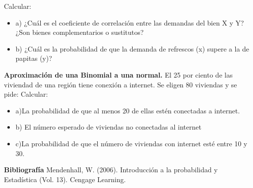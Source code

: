 \documentclass{../oxmathproblems}
\begin{document}
\begin{questions}
Calcular:  
\begin{itemize}
\item  a) ¿Cuál es el coeficiente de correlación entre las demandas del bien X y Y? ¿Son bienes complementarios o sustitutos?
\item  b) ¿Cuál es la probabilidad de que la demanda de refrescos (x) supere a la de papitas (y)?
\end{itemize}

\miquestion \textbf {Aproximación de una Binomial a una normal. } El 25 por ciento de las viviendad de una región tiene conexión a internet. Se eligen 80 viviendas y se pide: 
Calcular:  
\begin{itemize}
\item  a)La probabilidad de que al menos 20 de ellas estén conectadas a internet. 
\item  b) El número esperado de viviendas no conectadas al internet 
\item  c)La probabilidad de que el número de viviendas con internet esté entre 10 y 30. 
\end{itemize}

\end{questions}

\textbf{Bibliografía}
Mendenhall, W. (2006). Introducción a la probabilidad y Estadística (Vol. 13). Cengage Learning.
\end{document}
